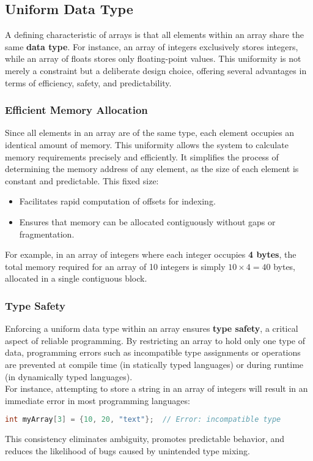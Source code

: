\documentclass[12pt, oneside]{book}
\begin{document}
	\subsection{Uniform Data Type}
	A defining characteristic of arrays is that all elements within an array share the same \textbf{data type}. For instance, an array of integers exclusively stores integers, while an array of floats stores only floating-point values. This uniformity is not merely a constraint but a deliberate design choice, offering several advantages in terms of efficiency, safety, and predictability.
	
	\subsubsection{Efficient Memory Allocation}
	Since all elements in an array are of the same type, each element occupies an identical amount of memory. This uniformity allows the system to calculate memory requirements precisely and efficiently. It simplifies the process of determining the memory address of any element, as the size of each element is constant and predictable. This fixed size:
	\begin{itemize}
		\item Facilitates rapid computation of offsets for indexing.
		\item  Ensures that memory can be allocated contiguously without gaps or fragmentation.
	\end{itemize}
	For example, in an array of integers where each integer occupies \textbf{4 bytes}, the total memory required for an array of 10 integers is simply \(10 \times 4 = 40\) bytes, allocated in a single contiguous block.
	\subsubsection{Type Safety}
	Enforcing a uniform data type within an array ensures \textbf{type safety}, a critical aspect of reliable programming. By restricting an array to hold only one type of data, programming errors such as incompatible type assignments or operations are prevented at compile time (in statically typed languages) or during runtime (in dynamically typed languages).\\
	For instance, attempting to store a string in an array of integers will result in an immediate error in most programming languages:
	\begin{lstlisting}[language=C]
		int myArray[3] = {10, 20, "text"};  // Error: incompatible type
	\end{lstlisting}
	This consistency eliminates ambiguity, promotes predictable behavior, and reduces the likelihood of bugs caused by unintended type mixing.
	
\end{document}
